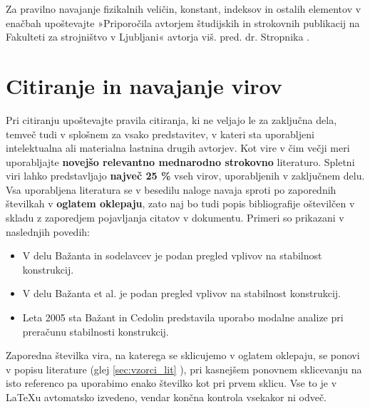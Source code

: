 Za pravilno navajanje fizikalnih veličin, konstant, indeksov in ostalih elementov v enačbah upoštevajte »Priporočila avtorjem študijskih in strokovnih publikacij na Fakulteti za strojništvo v Ljubljani« avtorja viš. pred. dr. Stropnika \cite{stropnik_1997}.\\

\section{Citiranje in navajanje virov}\label{sec:citiranje}

Pri citiranju upoštevajte pravila citiranja, ki ne veljajo le za zaključna dela, temveč tudi v splošnem za vsako predstavitev, v kateri sta uporabljeni intelektualna ali materialna lastnina drugih avtorjev. Kot vire v čim večji meri uporabljajte \textbf{novejšo relevantno mednarodno strokovno} literaturo. Spletni viri lahko predstavljajo \textbf{največ 25 \%} vseh virov, uporabljenih v zaključnem delu.\\

Vsa uporabljena literatura se v besedilu naloge navaja sproti po zaporednih številkah v \textbf{oglatem oklepaju}, zato naj bo tudi popis bibliografije oštevilčen v skladu z zaporedjem pojavljanja citatov v dokumentu. Primeri so prikazani v naslednjih povedih:
\begin{itemize}
\item V delu Bažanta in sodelavcev \cite{bazant_1991} je podan pregled vplivov na stabilnost konstrukcij.
\item V delu Bažanta et al. \cite{bazant_1991} je podan pregled vplivov na stabilnost konstrukcij.
\item Leta 2005 sta Bažant in Cedolin \cite{bazant_1991} predstavila uporabo modalne analize pri preračunu stabilnosti konstrukcij.
\end{itemize}

Zaporedna številka vira, na katerega se sklicujemo v oglatem oklepaju, se ponovi v popisu literature (glej \ref{sec:vzorci_lit} ), pri kasnejšem ponovnem sklicevanju na isto referenco pa uporabimo enako številko kot pri prvem sklicu. Vse to je v \LaTeX u avtomatsko izvedeno, vendar končna kontrola vsekakor ni odveč.\\

